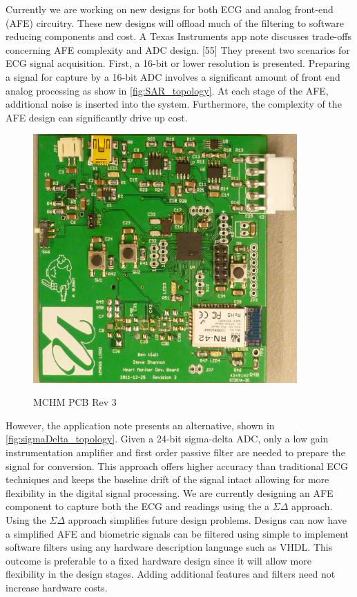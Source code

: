 Currently we are working on new designs for both ECG and  analog front-end (AFE) circuitry. These new designs will offload much of the filtering to software reducing components and cost. A Texas Instruments app note discusses trade-offs concerning AFE complexity and ADC design. [55] They present two scenarios for ECG signal acquisition. First, a 16-bit or lower resolution is presented. Preparing a signal for capture by a 16-bit ADC involves a significant amount of front end analog processing as show in \cref{fig:SAR_topology}.\cite{Soundarapandian2010} At each stage of the AFE, additional noise is inserted into the system. Furthermore, the complexity of the AFE design can significantly drive up cost.

\begin{figure}
	\begin{center}
		\label{fig:PCB_Rev3}
		\includegraphics[scale=1,width=0.9\textwidth]{Images/PCB_Rev3.jpg} 
		\caption{MCHM PCB Rev 3}
	\end{center}
\end{figure}

However, the application note presents an alternative, shown in \cref{fig:sigmaDelta_topology}. \cite{Soundarapandian2010} Given a 24-bit sigma-delta ADC, only a low gain instrumentation amplifier and first order passive filter are needed to prepare the signal for conversion.  This approach offers higher accuracy than traditional ECG techniques and keeps the baseline drift of the signal intact allowing for more flexibility in the digital signal processing. We are currently designing an AFE component to capture both the ECG and  readings using the a $ \Sigma\Delta $ approach. Using the $ \Sigma\Delta $ approach simplifies future design problems. Designs can now have a simplified AFE and biometric signals can be filtered using simple to implement software filters using any hardware description language such as VHDL. This outcome is preferable to a fixed hardware design since it will allow more flexibility in the design stages. Adding additional features and filters need not increase hardware costs.


